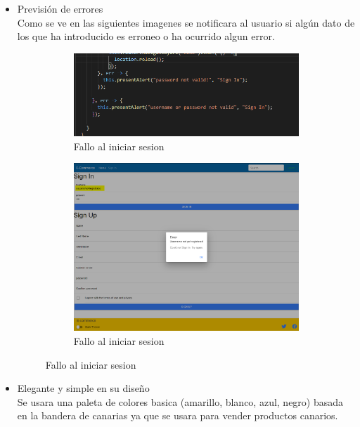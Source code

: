\documentclass{article}
\begin{document}
\begin{itemize}
   \item Previsión de errores\\
   \phantom{ab}Como se ve en las siguientes imagenes se notificara al usuario si algún dato de los que ha introducido es erroneo o ha ocurrido algun error.
\begin{figure}[h]
    \ContinuedFloat
    \centering
    \begin{subfigure}[h]{0.45\textwidth}
    \includegraphics[scale=0.25]{usability/errors.png}
    \caption{Fallo al iniciar sesion}
    \label{Fig:Fail_signIn}
    \end{subfigure}
    \begin{subfigure}[h]{0.45\textwidth}
        \includegraphics[scale=0.25]{usability/errorWindow.png}
        \caption{Fallo al iniciar sesion}
        \label{Fig:Fail_signIn2}
        \end{subfigure}
\end{figure}
    \item Elegante y simple en su diseño\\
   \phantom{ab}Se usara una paleta de colores basica (amarillo, blanco, azul, negro) basada en la bandera de canarias ya que se usara para vender productos canarios.

\end{itemize}
\end{document}
